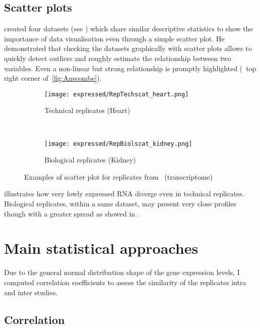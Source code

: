 \subsection{Scatter plots}

\cite{anscombe} created four datasets (see )
which share similar descriptive statistics to show the importance
of data visualisation even through a simple scatter plot.
He demonstrated that checking the datasets graphically with scatter plots
allows to quickly detect outliers and roughly estimate
the relationship between two variables.
Even a non-linear but strong relationship is promptly highlighted
(\eg\ top right corner of~\cref{fig:Anscombe}).

\begin{figure}
    \centering
    \begin{subfigure}[b]{0.48\textwidth}
        \centering \texttt{[image: expressed/RepTechscat\_heart.png]}
        \caption{Technical replicates (Heart)}\label{fig:scatTechRep}
    \end{subfigure}~%
    \begin{subfigure}[b]{0.48\textwidth}
    \centering \texttt{[image: expressed/RepBiolscat\_kidney.png]}
        \caption{Biological replicates (Kidney)}\label{fig:scatBiolRep}
    \end{subfigure}
    \caption{Examples of scatter plot for replicates from \uhlen\
    (transcriptome)}\label{fig:scatEg}
\end{figure}

 illustrates how very lowly expressed \gls{RNA}
diverge even in technical replicates.
Biological replicates, within a same dataset,
may present very close profiles though with a greater spread
as showed in .


\section{Main statistical approaches}

Due to the general normal distribution shape of the gene expression levels,
I computed correlation coefficients to assess the similarity of the replicates
intra and inter studies.

\subsection{Correlation}

